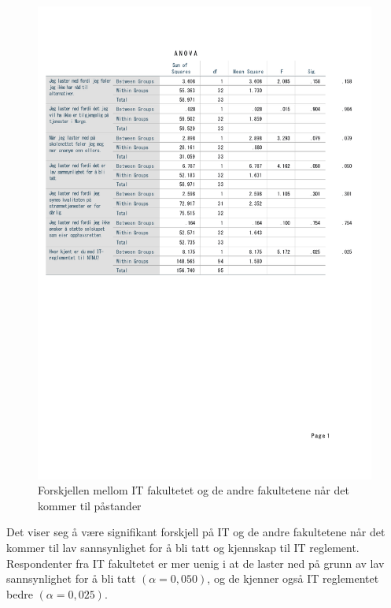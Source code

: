 \begin{figure}[H]
    \centering
    \includegraphics[scale=0.7]{case_1/bilder/fakultet_pastander_anova.pdf}
    \caption[Forskjellen mellom fakultetene på påstander]{Forskjellen mellom IT fakultetet og de andre fakultetene når det kommer til påstander}
    \label{fig:fakultet_pastander_anova}
\end{figure}

Det viser seg å være signifikant forskjell på IT og de andre fakultetene når det kommer til lav sannsynlighet for å bli tatt og kjennskap til IT reglement. Respondenter fra IT fakultetet er mer uenig i at de laster ned på grunn av lav sannsynlighet for å bli tatt \((\alpha = 0,050)\), og de kjenner også IT reglementet bedre \((\alpha = 0,025)\). 

